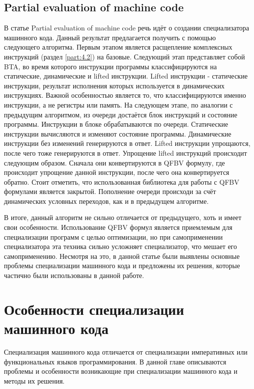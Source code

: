 \subsection{Partial evaluation of machine code}
В статье Partial evaluation of machine code\cite{PEMC} речь идёт о создании специализатора машинного кода. Данный результат предлагается получить с помощью следующего алгоритма. Первым этапом является расщепление комплексных инструкций (раздел \ref{part:4.2}) на базовые. Следующий этап представляет собой BTA, во время которого инструкции программы классифицируются на статические, динамические и lifted инструкции. Lifted инструкции - статические инструкции, результат исполнения которых используется в динамических инструкциях. Важной особенностью является то, что классифицируются именно инструкции, а не регистры или память. На следующем этапе, по аналогии с предыдущим алгоритмом, из очереди достаётся блок инструкций и состояние программы. Инструкции в блоке обрабатываются по очереди. Статические инструкции вычисляются и изменяют состояние программы. Динамические инструкции без изменений генерируются в ответ. Lifted инструкции упрощаются, после чего тоже генерируются в ответ. Упрощение lifted инструкций происходит следующим образом. Сначала они конвертируются в QFBV\cite{QFBV} формулу, где происходит упрощение данной инструкции, после чего она конвертируется обратно. Стоит отметить, что использованная библиотека для работы с QFBV формулами является закрытой. Пополнение очереди происходи за счёт динамических условных переходов, как и в предыдущем алгоритме.

В итоге, данный алгоритм не сильно отличается от предыдущего, хоть и имеет свои особенности. Использование QFBV формул является приемлемым для специализации программ с целью оптимизации, но при самоприменении специализатора эта техника сильно усложняет специализатор, что мешает его самоприменению. Несмотря на это, в данной статье были выявлены основные проблемы специализации машинного кода и предложены их решения, которые частично были использованы в данной работе. 

\section{Особенности специализации машинного кода}

Специализация машинного кода отличается от специализации императивных или функциональных языков программирования. В данной главе описываются проблемы и особенности возникающие при специализации машинного кода и методы их решения.

